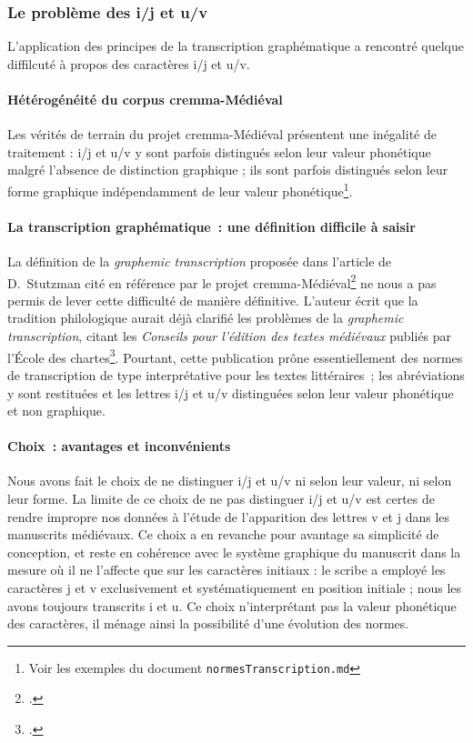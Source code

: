 \documentclass{article}
\begin{document}
	\subsubsection{Le problème des i/j et u/v}
	L'application des principes de la transcription graphématique a rencontré quelque diffilcuté à propos des caractères i/j et u/v. 
	\paragraph{Hétérogénéité du corpus \gls{cremma}-Médiéval}
	Les vérités de terrain du projet \gls{cremma}-Médiéval présentent une inégalité de traitement : i/j et u/v y sont parfois distingués selon leur valeur phonétique malgré l'absence de distinction graphique ; ils sont parfois distingués selon leur forme graphique indépendamment de leur valeur phonétique\footnote{Voir les exemples du document \texttt{normesTranscription.md}}.
	
	\paragraph{La transcription graphématique~: une définition difficile à saisir}
	La définition de la \textit{graphemic transcription} proposée dans l'article de D.~Stutzman cité en référence par le projet \gls{cremma}-Médiéval\footcite[p.~251]{stutzmannPaleographieStatistiquePour2011} ne nous a pas permis de lever cette difficulté de manière définitive. L'auteur écrit que la tradition philologique aurait déjà clarifié les problèmes de la \textit{graphemic transcription}, citant les \textit{Conseils pour l'édition des textes médiévaux} publiés par l'École des chartes\footcite{ecolenationaledeschartesConseilsPourEdition2001a}. Pourtant, cette publication prône essentiellement des normes de transcription de type interprétative pour les textes littéraires~; les abréviations y sont restituées et les lettres i/j et u/v distinguées selon leur valeur phonétique et non graphique.
	
	\paragraph{Choix~: avantages et inconvénients}
	Nous avons fait le choix de ne distinguer i/j et u/v ni selon leur valeur, ni selon leur forme. La limite de ce choix de ne pas distinguer i/j et u/v est certes de rendre impropre nos données à l'étude de l'apparition des lettres v et j dans les manuscrits médiévaux. Ce choix a en revanche pour avantage sa simplicité de conception, et reste en cohérence avec le système graphique du manuscrit dans la mesure où il ne l'affecte que sur les caractères initiaux : le scribe a employé les caractères j et v exclusivement et systématiquement en position initiale ; nous les avons toujours transcrits i et u. Ce choix n'interprétant pas la valeur phonétique des caractères, il ménage ainsi la possibilité d'une évolution des normes.
	
\end{document}
